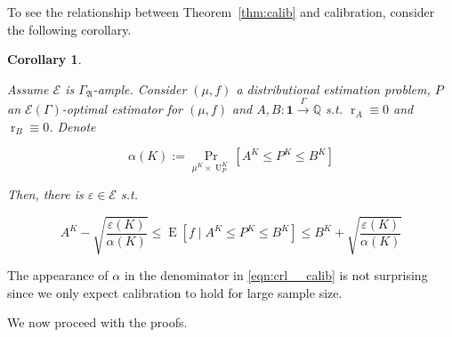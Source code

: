 \documentclass{article}
\numberwithin{equation}{section}
\theoremstyle{definition}
\theoremstyle{plain}
\newtheorem{corollary}{Corollary}[section]
\DeclareMathOperator{\Prb}{Pr}
\DeclareMathOperator{\E}{E}
\DeclareMathOperator{\R}{r}
\DeclareMathOperator{\Un}{U}
\newcommand{\Rats}{\mathbb{Q}}
\newcommand{\GrowA}{\Gamma_{\mathfrak{A}}}
\newcommand{\Fall}{\mathcal{E}}
\newcommand{\EG}{\Fall(\Gamma)}
\newcommand{\Scheme}{\xrightarrow{\Gamma}}
\begin{document}
To see the relationship between Theorem~\ref{thm:calib} and calibration, consider the following corollary.

\begin{corollary}
\label{crl:calib}

Assume $\Fall$ is $\GrowA$-ample. Consider $(\mu,f)$ a distributional estimation problem, $P$ an $\EG$-optimal estimator for $(\mu,f)$ and $A,B: \bm{1} \Scheme \Rats$ s.t. $\R_A \equiv 0$ and $\R_B \equiv 0$. Denote

\[\alpha(K):=\Prb_{\mu^{K} \times \Un_P^{K}}[A^{K} \leq P^{K} \leq B^{K}]\] 

Then, there is $\varepsilon \in \Fall$ s.t. 

\begin{equation}
\label{eqn:crl__calib}
A^{K} - \sqrt{\frac{\varepsilon(K)}{\alpha(K)}} \leq \E[f \mid A^{K} \leq P^{K} \leq B^{K}] \leq B^{K} + \sqrt{\frac{\varepsilon(K)}{\alpha(K)}}
\end{equation}

\end{corollary}

The appearance of $\alpha$ in the denominator in \ref{eqn:crl__calib} is not surprising since we only expect calibration to hold for large sample size.

We now proceed with the proofs.
\end{document}
